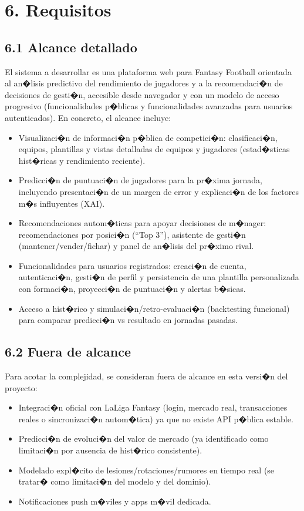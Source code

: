 \section*{6. Requisitos}

\subsection{6.1 Alcance detallado}

El sistema a desarrollar es una plataforma web para Fantasy Football orientada al an�lisis predictivo 
del rendimiento de jugadores y a la recomendaci�n de decisiones de gesti�n, accesible desde navegador y 
con un modelo de acceso progresivo (funcionalidades p�blicas y funcionalidades avanzadas para usuarios 
autenticados). En concreto, el alcance incluye:

\begin{itemize}
  \item Visualizaci�n de informaci�n p�blica de competici�n: clasificaci�n, equipos, plantillas y vistas 
  detalladas de equipos y jugadores (estad�sticas hist�ricas y rendimiento reciente).
  \item Predicci�n de puntuaci�n de jugadores para la pr�xima jornada, incluyendo presentaci�n de un 
  margen de error y explicaci�n de los factores m�s influyentes (XAI).
  \item Recomendaciones autom�ticas para apoyar decisiones de m�nager: recomendaciones por posici�n 
  (``Top 3''), asistente de gesti�n (mantener/vender/fichar) y panel de an�lisis del pr�ximo rival.
  \item Funcionalidades para usuarios registrados: creaci�n de cuenta, autenticaci�n, gesti�n de perfil y 
  persistencia de una plantilla personalizada con formaci�n, proyecci�n de puntuaci�n y alertas b�sicas.
  \item Acceso a hist�rico y simulaci�n/retro-evaluaci�n (backtesting funcional) para comparar predicci�n 
  vs resultado en jornadas pasadas.
\end{itemize}

\subsection{6.2 Fuera de alcance}

Para acotar la complejidad, se consideran fuera de alcance en esta versi�n del proyecto:

\begin{itemize}
  \item Integraci�n oficial con LaLiga Fantasy (login, mercado real, transacciones reales o sincronizaci�n 
  autom�tica) ya que no existe API p�blica estable.
  \item Predicci�n de evoluci�n del valor de mercado (ya identificado como limitaci�n por ausencia de 
  hist�rico consistente).
  \item Modelado expl�cito de lesiones/rotaciones/rumores en tiempo real (se tratar� como limitaci�n del 
  modelo y del dominio).
  \item Notificaciones push m�viles y apps m�vil dedicada.
\end{itemize}

